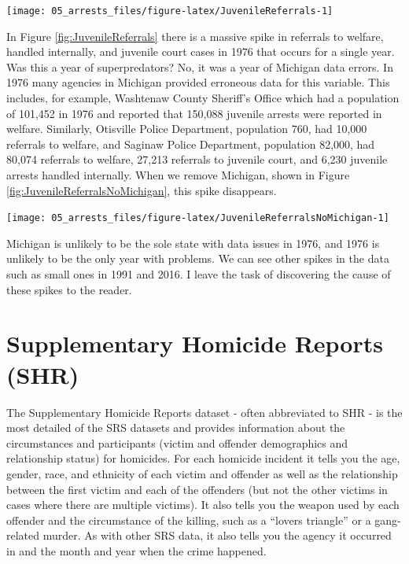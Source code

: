 \documentclass[
]{krantz}
\let\origfigure\figure
\let\endorigfigure\endfigure
\renewenvironment{figure}[1][2] {
    \expandafter\origfigure\expandafter[H]
} {
    \endorigfigure
}
\begin{document}
\begin{figure}

{\centering \texttt{[image: 05\_arrests\_files/figure-latex/JuvenileReferrals-1]} 

}

\caption{The annual number of juvenile referrals in the United States by referral type, 1974-2020.}\label{fig:JuvenileReferrals}
\end{figure}

In Figure \ref{fig:JuvenileReferrals} there is a massive
spike in referrals to welfare, handled internally, and
juvenile court cases in 1976 that occurs for a single year.
Was this a year of superpredators? No, it was a year of
Michigan data errors. In 1976 many agencies in Michigan
provided erroneous data for this variable. This includes,
for example, Washtenaw County Sheriff's Office which had a
population of 101,452 in 1976 and reported that 150,088
juvenile arrests were reported in welfare. Similarly,
Otisville Police Department, population 760, had 10,000
referrals to welfare, and Saginaw Police Department,
population 82,000, had 80,074 referrals to welfare, 27,213
referrals to juvenile court, and 6,230 juvenile arrests
handled internally. When we remove Michigan, shown in Figure
\ref{fig:JuvenileReferralsNoMichigan}, this spike
disappears.

\begin{figure}

{\centering \texttt{[image: 05\_arrests\_files/figure-latex/JuvenileReferralsNoMichigan-1]} 

}

\caption{The annual number of juvenile referrals in the United States excluding agencies in Michigan by referral type, 1974-2020.}\label{fig:JuvenileReferralsNoMichigan}
\end{figure}

Michigan is unlikely to be the sole state with data issues
in 1976, and 1976 is unlikely to be the only year with
problems. We can see other spikes in the data such as small
ones in 1991 and 2016. I leave the task of discovering the
cause of these spikes to the reader.

\chapter{Supplementary Homicide Reports (SHR)}\label{shr}

The Supplementary Homicide Reports dataset - often
abbreviated to SHR - is the most detailed of the SRS
datasets and provides information about the circumstances
and participants (victim and offender demographics and
relationship status) for homicides. For each homicide
incident it tells you the age, gender, race, and ethnicity
of each victim and offender as well as the relationship
between the first victim and each of the offenders (but not
the other victims in cases where there are multiple
victims). It also tells you the weapon used by each offender
and the circumstance of the killing, such as a ``lovers
triangle'' or a gang-related murder. As with other SRS data,
it also tells you the agency it occurred in and the month
and year when the crime happened.
\end{document}
